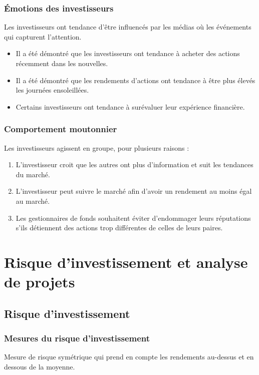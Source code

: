 \documentclass[10pt, french]{article}
\begin{document}
\begin{multicols*}{2}
\subsubsection{Émotions des investisseurs}
Les investisseurs ont tendance d'être influencés par les médias où les événements qui capturent l'attention.
\begin{itemize}
	\item	Il a été démontré que les investisseurs ont tendance à acheter des actions récemment dans les nouvelles.
	\item	Il a été démontré que les rendements d'actions ont tendance à être plus élevés les journées ensoleillées.
	\item	Certains investisseurs ont tendance à surévaluer leur expérience financière.
\end{itemize}


\subsubsection{Comportement moutonnier}
Les investisseurs agissent en groupe, pour plusieurs raisons : 
\begin{enumerate}
	\item	L'investisseur croit que les autres ont plus d'information et suit les tendances du marché.
	\item	L'investisseur peut suivre le marché afin d'avoir un rendement au moins égal au marché.
	\item	Les gestionnaires de fonds souhaitent éviter d'endommager leurs réputations s'ils détiennent des actions trop différentes de celles de leurs paires.
\end{enumerate}


\pagebreak
\section{Risque d'investissement et analyse de projets}
\subsection{Risque d'investissement}
\subsubsection{Mesures du risque d'investissement}
\begin{definitionNOHFILL}[Variance]
Mesure de risque symétrique qui prend en compte les rendements au-dessus et en dessous de la moyenne.
\end{definitionNOHFILL}


\end{multicols*}
\end{document}
